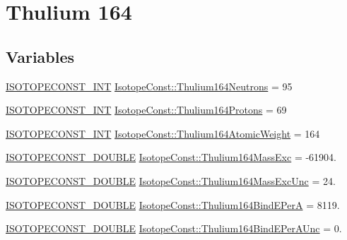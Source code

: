 \hypertarget{group___isotope_const-_thulium-_tm164}{}\section{Thulium 164}
\label{group___isotope_const-_thulium-_tm164}
\subsection*{Variables}
\begin{DoxyCompactItemize}
\item 
\mbox{\hyperlink{group___isotope_const-_macros_ga5f18360b3e99483a35c32d789e62621c}{I\+S\+O\+T\+O\+P\+E\+C\+O\+N\+S\+T\+\_\+\+I\+NT}} \mbox{\hyperlink{group___isotope_const-_thulium-_tm164_ga48e6bad7d94e3d0765732bb5c53a71a4}{Isotope\+Const\+::\+Thulium164\+Neutrons}} = 95
\item 
\mbox{\hyperlink{group___isotope_const-_macros_ga5f18360b3e99483a35c32d789e62621c}{I\+S\+O\+T\+O\+P\+E\+C\+O\+N\+S\+T\+\_\+\+I\+NT}} \mbox{\hyperlink{group___isotope_const-_thulium-_tm164_ga61d1c7ebd4ca82278ab7c1d6fd6ce184}{Isotope\+Const\+::\+Thulium164\+Protons}} = 69
\item 
\mbox{\hyperlink{group___isotope_const-_macros_ga5f18360b3e99483a35c32d789e62621c}{I\+S\+O\+T\+O\+P\+E\+C\+O\+N\+S\+T\+\_\+\+I\+NT}} \mbox{\hyperlink{group___isotope_const-_thulium-_tm164_ga711eb4af6c720547873442c7be921bfc}{Isotope\+Const\+::\+Thulium164\+Atomic\+Weight}} = 164
\item 
\mbox{\hyperlink{group___isotope_const-_macros_ga8f45a7272ce02c0b4c65c44636ed719a}{I\+S\+O\+T\+O\+P\+E\+C\+O\+N\+S\+T\+\_\+\+D\+O\+U\+B\+LE}} \mbox{\hyperlink{group___isotope_const-_thulium-_tm164_ga9ffe55eb26ca44a6581972a34c9cf1a9}{Isotope\+Const\+::\+Thulium164\+Mass\+Exc}} = -\/61904.
\item 
\mbox{\hyperlink{group___isotope_const-_macros_ga8f45a7272ce02c0b4c65c44636ed719a}{I\+S\+O\+T\+O\+P\+E\+C\+O\+N\+S\+T\+\_\+\+D\+O\+U\+B\+LE}} \mbox{\hyperlink{group___isotope_const-_thulium-_tm164_ga843efb62a38083b3fd5b4e1d98adceec}{Isotope\+Const\+::\+Thulium164\+Mass\+Exc\+Unc}} = 24.
\item 
\mbox{\hyperlink{group___isotope_const-_macros_ga8f45a7272ce02c0b4c65c44636ed719a}{I\+S\+O\+T\+O\+P\+E\+C\+O\+N\+S\+T\+\_\+\+D\+O\+U\+B\+LE}} \mbox{\hyperlink{group___isotope_const-_thulium-_tm164_ga96cc1e489add3899bd2b54fc8439c638}{Isotope\+Const\+::\+Thulium164\+Bind\+E\+PerA}} = 8119.
\item 
\mbox{\hyperlink{group___isotope_const-_macros_ga8f45a7272ce02c0b4c65c44636ed719a}{I\+S\+O\+T\+O\+P\+E\+C\+O\+N\+S\+T\+\_\+\+D\+O\+U\+B\+LE}} \mbox{\hyperlink{group___isotope_const-_thulium-_tm164_ga43fdbffc3ed1de8cdac8e43575d8da56}{Isotope\+Const\+::\+Thulium164\+Bind\+E\+Per\+A\+Unc}} = 0.

\end{DoxyCompactItemize}
